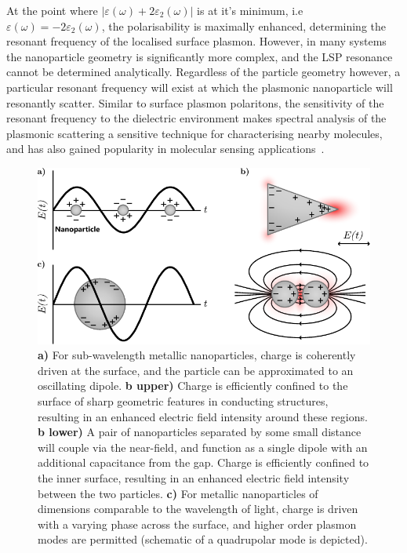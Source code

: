 At the point where $\lvert \varepsilon (\omega) + 2\varepsilon_2 (\omega) \rvert$ is at it's minimum, i.e $\varepsilon (\omega) = -2\varepsilon_2 (\omega)$, the polarisability is maximally enhanced, determining the resonant frequency of the localised surface plasmon. However, in many systems the nanoparticle geometry is significantly more complex, and the LSP resonance cannot be determined analytically. Regardless of the particle geometry however, a particular resonant frequency will exist at which the plasmonic nanoparticle will resonantly scatter. Similar to surface plasmon polaritons, the sensitivity of the resonant frequency to the dielectric environment makes spectral analysis of the plasmonic scattering a sensitive technique for characterising nearby molecules, and has also gained popularity in molecular sensing applications~\cite{Petryayeva2011a, Polavarapu2014, Cheng2015}.


\begin{figure}[htb!]
    \centering
    \includegraphics[scale=1.0]{./figures/background/plasmonics/lsp.pdf}
    \caption{\label{fig:background:Plasmonics:LSP} \textbf{a)} For sub-wavelength metallic nanoparticles, charge is coherently driven at the surface, and the particle can be approximated to an oscillating dipole. \textbf{b upper)} Charge is efficiently confined to the surface of sharp geometric features in conducting structures, resulting in an enhanced electric field intensity around these regions.  \textbf{b lower)} A pair of nanoparticles separated by some small distance will couple via the near-field, and function as a single dipole with an additional capacitance from the gap. Charge is efficiently confined to the inner surface, resulting in an enhanced electric field intensity between the two particles. \textbf{c)} For metallic nanoparticles of dimensions comparable to the wavelength of light, charge is driven with a varying phase across the surface, and higher order plasmon modes are permitted (schematic of a quadrupolar mode is depicted).}
\end{figure}


